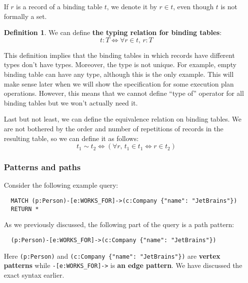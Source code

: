 \documentclass[14pt]{constructor-thesis}
\theoremstyle{definition}
\newtheorem*{definition}{Definition}
\begin{document}
If $r$ is a record of a binding table $t$, we denote it by $r \in t$, even though $t$ is not formally a set.

\begin{definition}
  We can define \textbf{the typing relation for binding tables}:
  $$ t : T \Longleftrightarrow \forall r \in t, \, r : T $$
\end{definition}

This definition implies that the binding tables in which records have different types don't have types. Moreover, the type is not unique. For example, empty binding table can have any type, although this is the only example. This will make sense later when we will show the specification for some execution plan operations. However, this means that we cannot define ``type of'' operator for all binding tables but we won't actually need it.

Last but not least, we can define the equivalence relation on binding tables. We are not bothered by the order and number of repetitions of records in the resulting table, so we can define it as follows:
$$ t_1 \sim t_2 \Longleftrightarrow (\forall r, \, t_1 \in t_1 \Leftrightarrow r \in t_2) $$

\subsubsection{Patterns and paths}

Consider the following example query:
\begin{verbatim}
  MATCH (p:Person)-[e:WORKS_FOR]->(c:Company {"name": "JetBrains"})
  RETURN *
\end{verbatim}

As we previously discussed, the following part of the query is a path pattern:
\begin{verbatim}
  (p:Person)-[e:WORKS_FOR]->(c:Company {"name": "JetBrains"})
\end{verbatim}

Here \verb+(p:Person)+ and \verb+(c:Company {"name": "JetBrains"})+ are \textbf{vertex patterns} while \verb+-[e:WORKS_FOR]->+ is \textbf{an edge pattern}. We have discussed the exact syntax earlier.

\end{document}
